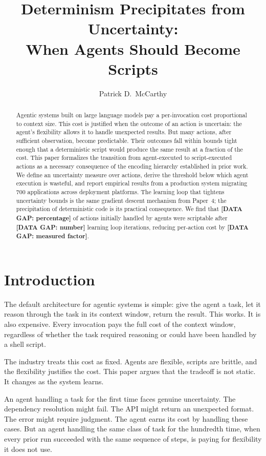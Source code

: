 \documentclass[11pt]{article}
\title{Determinism Precipitates from Uncertainty:\\When Agents Should Become Scripts}
\author{Patrick D.\ McCarthy}
\date{}
\theoremstyle{definition}
\begin{document}
\maketitle

\begin{abstract}
Agentic systems built on large language models pay a per-invocation cost
proportional to context size. This cost is justified when the outcome of
an action is uncertain: the agent's flexibility allows it to handle
unexpected results. But many actions, after sufficient observation,
become predictable. Their outcomes fall within bounds tight enough that
a deterministic script would produce the same result at a fraction of
the cost. This paper formalizes the transition from agent-executed to
script-executed actions as a necessary consequence of the encoding
hierarchy established in prior work. We define an uncertainty measure
over actions, derive the threshold below which agent execution is
wasteful, and report empirical results from a production system
migrating 700 applications across deployment platforms. The learning
loop that tightens uncertainty bounds is the same gradient descent
mechanism from Paper~4; the precipitation of deterministic code is its
practical consequence. We find that
\textbf{[DATA GAP: percentage]} of actions initially handled by agents
were scriptable after \textbf{[DATA GAP: number]} learning loop
iterations, reducing per-action cost by
\textbf{[DATA GAP: measured factor]}.
\end{abstract}

\section{Introduction}
\label{sec:intro}

The default architecture for agentic systems is simple: give the agent
a task, let it reason through the task in its context window, return
the result. This works. It is also expensive. Every invocation pays the
full cost of the context window, regardless of whether the task required
reasoning or could have been handled by a shell script.

The industry treats this cost as fixed. Agents are flexible, scripts are
brittle, and the flexibility justifies the cost. This paper argues that
the tradeoff is not static. It changes as the system learns.

An agent handling a task for the first time faces genuine uncertainty.
The dependency resolution might fail. The API might return an unexpected
format. The error might require judgment. The agent earns its cost by
handling these cases. But an agent handling the same class of task for
the hundredth time, when every prior run succeeded with the same
sequence of steps, is paying for flexibility it does not use.
\end{document}
